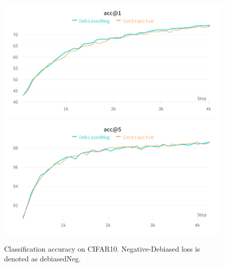 \documentclass{article}
\begin{document}
\begin{figure}[!htb]
\includegraphics[width=\linewidth]{figures/baseline_acc1.png}
\endminipage\hfill
{}
\includegraphics[width=\linewidth]{figures/baseline_acc5.png}
\endminipage
\caption{Classification accuracy on CIFAR10. Negative-Debiased loss is denoted as debiasedNeg.}
\label{fig:fig1}
\end{figure}
\end{document}

